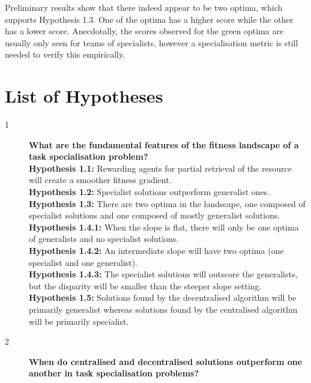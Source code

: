 \documentclass[12pt]{article}
\begin{document}
Preliminary results show that there indeed appear to be two optima, which supports Hypothesis 1.3.
One of the optima has a higher score while the other has a lower score.
Anecdotally, the scores observed for the green optima are usually only seen for teams of specialists, however a specialisation metric is still needed to verify this empirically.\\

\section{List of Hypotheses}

\begin{description}
\item[1] \textbf{What are the fundamental features of the fitness landscape of a task specialisation problem?}\\

\textbf{Hypothesis 1.1:} Rewarding agents for partial retrieval of the resource will create a smoother fitness gradient.\\

\textbf{Hypothesis 1.2:} Specialist solutions outperform generalist ones.\\

\textbf{Hypothesis 1.3:} There are two optima in the landscape, one composed of specialist solutions and one composed of mostly generalist solutions. \\

\textbf{Hypothesis 1.4.1:} When the slope is flat, there will only be one optima of generalists and no specialist solutions.\\

\textbf{Hypothesis 1.4.2:} An intermediate slope will have two optima (one specialist and one generalist).\\

\textbf{Hypothesis 1.4.3:} The specialist solutions will outscore the generalists, but the disparity will be smaller than the steeper slope setting. \\

\textbf{Hypothesis 1.5:} Solutions found by the decentralised algorithm will be primarily generalist whereas solutions found by the centralised algorithm will be primarily specialist.\\

\item[2] \textbf{When do centralised and decentralised solutions outperform one another in task specialisation problems?}\\


\end{description}
\end{document}
